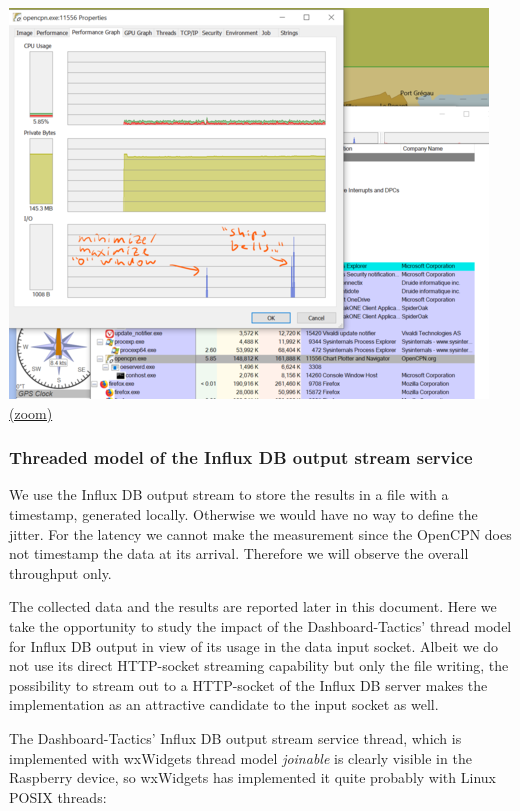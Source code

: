 \documentclass[11pt]{article}
\begin{document}
    \includegraphics{2019-10-12_211525_w10_ov50_def_config_TCP_perfgraph.png}
\href{img/2019-10-12_211525_w10_ov50_def_config_TCP_perfgraph.png}{(zoom)}

    \hypertarget{threaded-model-of-the-influx-db-output-stream-service}{%
\subsubsection{Threaded model of the Influx DB output stream
service}\label{threaded-model-of-the-influx-db-output-stream-service}}

    We use the Influx DB output stream to store the results in a file with a
timestamp, generated locally. Otherwise we would have no way to define
the jitter. For the latency we cannot make the measurement since the
OpenCPN does not timestamp the data at its arrival. Therefore we will
observe the overall throughput only.

    The collected data and the results are reported later in this document.
Here we take the opportunity to study the impact of the
Dashboard-Tactics' thread model for Influx DB output in view of its
usage in the data input socket. Albeit we do not use its direct
HTTP-socket streaming capability but only the file writing, the
possibility to stream out to a HTTP-socket of the Influx DB server makes
the implementation as an attractive candidate to the input socket as
well.

    The Dashboard-Tactics' Influx DB output stream service thread, which is
implemented with wxWidgets thread model \emph{joinable} is clearly
visible in the Raspberry device, so wxWidgets has implemented it quite
probably with Linux POSIX threads:
\end{document}

